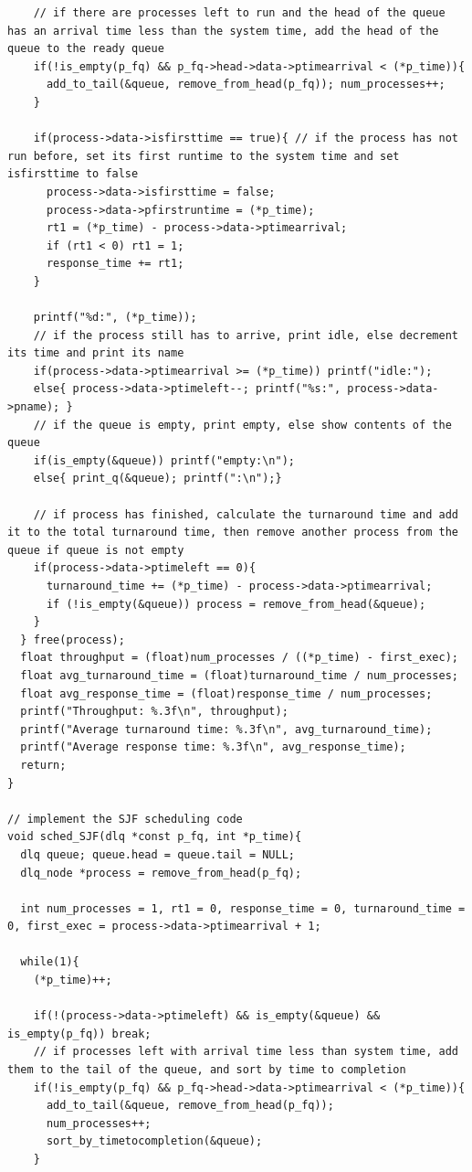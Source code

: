 \documentclass{article}
\theoremstyle{mytheoremstyle}
\theoremstyle{mytheoremstyle}
\theoremstyle{myproblemstyle}
\begin{document}
\begin{lstlisting}
    // if there are processes left to run and the head of the queue has an arrival time less than the system time, add the head of the queue to the ready queue
    if(!is_empty(p_fq) && p_fq->head->data->ptimearrival < (*p_time)){
      add_to_tail(&queue, remove_from_head(p_fq)); num_processes++;
    }

    if(process->data->isfirsttime == true){ // if the process has not run before, set its first runtime to the system time and set isfirsttime to false
      process->data->isfirsttime = false;
      process->data->pfirstruntime = (*p_time);
      rt1 = (*p_time) - process->data->ptimearrival;
      if (rt1 < 0) rt1 = 1;
      response_time += rt1;
    }

    printf("%d:", (*p_time));
    // if the process still has to arrive, print idle, else decrement its time and print its name
    if(process->data->ptimearrival >= (*p_time)) printf("idle:");
    else{ process->data->ptimeleft--; printf("%s:", process->data->pname); }
    // if the queue is empty, print empty, else show contents of the queue
    if(is_empty(&queue)) printf("empty:\n");
    else{ print_q(&queue); printf(":\n");}

    // if process has finished, calculate the turnaround time and add it to the total turnaround time, then remove another process from the queue if queue is not empty
    if(process->data->ptimeleft == 0){
      turnaround_time += (*p_time) - process->data->ptimearrival;
      if (!is_empty(&queue)) process = remove_from_head(&queue);
    }
  } free(process);
  float throughput = (float)num_processes / ((*p_time) - first_exec);
  float avg_turnaround_time = (float)turnaround_time / num_processes;
  float avg_response_time = (float)response_time / num_processes;
  printf("Throughput: %.3f\n", throughput);
  printf("Average turnaround time: %.3f\n", avg_turnaround_time);
  printf("Average response time: %.3f\n", avg_response_time);
  return;
}

// implement the SJF scheduling code
void sched_SJF(dlq *const p_fq, int *p_time){
  dlq queue; queue.head = queue.tail = NULL;
  dlq_node *process = remove_from_head(p_fq);

  int num_processes = 1, rt1 = 0, response_time = 0, turnaround_time = 0, first_exec = process->data->ptimearrival + 1;

  while(1){
    (*p_time)++;

    if(!(process->data->ptimeleft) && is_empty(&queue) && is_empty(p_fq)) break;
    // if processes left with arrival time less than system time, add them to the tail of the queue, and sort by time to completion
    if(!is_empty(p_fq) && p_fq->head->data->ptimearrival < (*p_time)){
      add_to_tail(&queue, remove_from_head(p_fq));
      num_processes++;
      sort_by_timetocompletion(&queue);
    }


\end{lstlisting}
\end{document}
